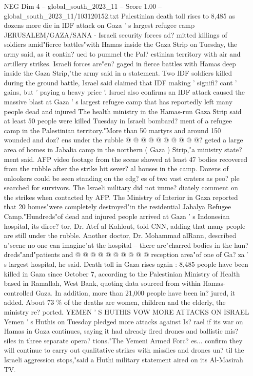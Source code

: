\begin{textsample}{NEG Dim 4 – global\_south\_2023\_11 – Score 1.00 – global\_south\_2023\_11/103120152.txt}  \label{ex:f4_neg_310}
Palestinian death toll rises to 8,485 as dozens more die in IDF attack on Gaza ' s largest refugee camp JERUSALEM/GAZA/SANA - Israeli security forces ad? mitted killings of soldiers amid"fierce battles"with Hamas inside the Gaza Strip on Tuesday, the army said, as it contin? ued to pummel the Pal? estinian territory with air and artillery strikes.
Israeli forces are"en? gaged in fierce battles with Hamas deep inside the Gaza Strip,"the army said in a statement.
Two IDF soldiers killed during the ground battle, Israel said claimed that IDF making ' signifi? cant ' gains, but ' paying a heavy price '.
Israel also confirms an IDF attack caused the massive blast at Gaza ' s largest refugee camp that has reportedly left many people dead and injured The health ministry in the Hamas-run Gaza Strip said at least 50 people were killed Tuesday in Israeli bombard? ment of a refugee camp in the Palestinian territory."More than 50 martyrs and around 150 wounded and doz? ens under the rubble @ @ @ @ @ @ @ @ @ @? geted a large area of homes in Jabalia camp in the northern ( Gaza ) Strip,"a ministry state? ment said.
AFP video footage from the scene showed at least 47 bodies recovered from the rubble after the strike hit sever? al houses in the camp.
Dozens of onlookers could be seen standing on the edg? es of two vast craters as peo? ple searched for survivors.
The Israeli military did not imme? diately comment on the strikes when contacted by AFP.
The Ministry of Interior in Gaza reported that 20 homes"were completely destroyed"in the residential Jabalya Refugee Camp."Hundreds"of dead and injured people arrived at Gaza ' s Indonesian hospital, its direc? tor, Dr.
Atef al-Kahlout, told CNN, adding that many people are still under the rubble.
Another doctor, Dr.
Mohammad alRann, described a"scene no one can imagine"at the hospital -- there are"charred bodies in the hun? dreds"and"patients and @ @ @ @ @ @ @ @ @ @ reception area"of one of Ga? za ' s largest hospital, he said.
Death toll in Gaza rises again : 8,485 people have been killed in Gaza since October 7, according to the Palestinian Ministry of Health based in Ramallah, West Bank, quoting data sourced from within Hamas-controlled Gaza.
In addition, more than 21,000 people have been in? jured, it added.
About 73 \% of the deaths are women, children and the elderly, the ministry re? ported.
YEMEN ' S HUTHIS VOW MORE ATTACKS ON ISRAEL Yemen ' s Huthis on Tuesday pledged more attacks against Is? rael if its war on Hamas in Gaza continues, saying it had already fired drones and ballistic mis? siles in three separate opera? tions."The Yemeni Armed Forc? es... confirm they will continue to carry out qualitative strikes with missiles and drones un? til the Israeli aggression stops,"said a Huthi military statement aired on its Al-Masirah TV.

\end{textsample}
